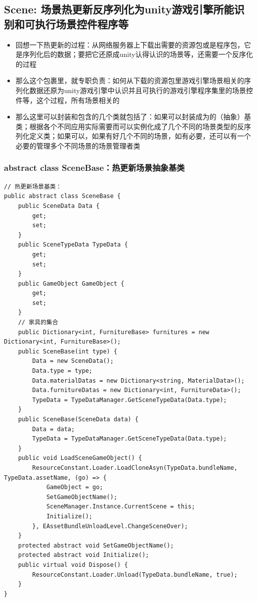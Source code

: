 \documentclass[9pt, b5paper]{article}
\begin{document}
\subsection{Scene: 场景热更新反序列化为unity游戏引擎所能识别和可执行场景控件程序等}
\label{sec-9-2}
\begin{itemize}
\item 回想一下热更新的过程：从网络服务器上下载出需要的资源包或是程序包，它是序列化后的数据；要把它还原成unity认得认识的场景等，还需要一个反序化的过程
\item 那么这个包裹里，就专职负责：如何从下载的资源包里游戏引擎场景相关的序列化数据还原为unity游戏引擎中认识并且可执行的游戏引擎程序集里的场景控件等，这个过程，所有场景相关的
\item 那么这里可以封装和包含的几个类就包括了：如果可以封装成为的（抽象）基类；根据各个不同应用实际需要而可以实例化成了几个不同的场景类型的反序列化定义类；如果可以，如果有好几个不同的场景，如有必要，还可以有一个必要的管理多个不同场景的场景管理者类
\end{itemize}
\subsubsection{abstract class SceneBase：热更新场景抽象基类}
\label{sec-9-2-1}
\begin{verbatim}
// 热更新场景基类：
public abstract class SceneBase {
    public SceneData Data {
        get;
        set;
    }
    public SceneTypeData TypeData {
        get;
        set;
    }
    public GameObject GameObject {
        get;
        set;
    }
    // 家具的集合
    public Dictionary<int, FurnitureBase> furnitures = new Dictionary<int, FurnitureBase>();
    public SceneBase(int type) {
        Data = new SceneData();
        Data.type = type;
        Data.materialDatas = new Dictionary<string, MaterialData>();
        Data.furnitureDatas = new Dictionary<int, FurnitureData>();
        TypeData = TypeDataManager.GetSceneTypeData(Data.type);
    }
    public SceneBase(SceneData data) {
        Data = data;
        TypeData = TypeDataManager.GetSceneTypeData(Data.type);
    }
    public void LoadSceneGameObject() {
        ResourceConstant.Loader.LoadCloneAsyn(TypeData.bundleName, TypeData.assetName, (go) => {
            GameObject = go;
            SetGameObjectName();
            SceneManager.Instance.CurrentScene = this;
            Initialize();
        }, EAssetBundleUnloadLevel.ChangeSceneOver);
    }
    protected abstract void SetGameObjectName();
    protected abstract void Initialize();
    public virtual void Dispose() {
        ResourceConstant.Loader.Unload(TypeData.bundleName, true);
    }
}
\end{verbatim}
\end{document}
